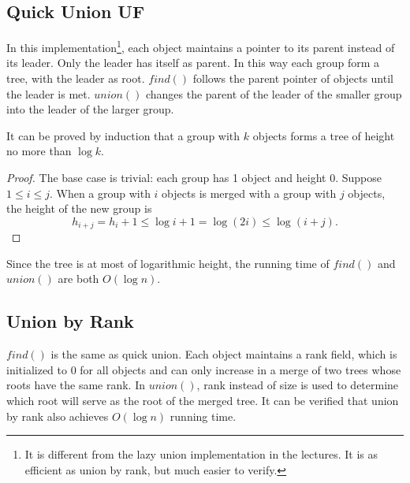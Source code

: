 \subsection{Quick Union UF}
\begin{multicols}{2}
\begin{algorithmic}[1]
\EndWhile
{}
\EndFunction
\end{algorithmic}
\columnbreak
\begin{algorithmic}[1]
\Else
{}
\EndIf
\EndFunction
\end{algorithmic}
\end{multicols}
In this implementation\footnote{It is different from the lazy union implementation in the lectures. It is as efficient as union by rank, but much easier to verify.}, each object maintains a pointer to its parent instead of its leader. Only the leader has itself as parent. In this way each group form a tree, with the leader as root. $find()$ follows the parent pointer of objects until the leader is met. $union()$ changes the parent of the leader of the smaller group into the leader of the larger group. 

It can be proved by induction that a group with $k$ objects forms a tree of height no more than $\log k$. 
\begin{proof}
The base case is trivial: each group has 1 object and height 0. Suppose $1\leq i\leq j$. When a group with $i$ objects is merged with a group with $j$ objects, the height of the new group is 
$$h_{i+j}=h_i+1\leq \log i + 1 = \log(2i)\leq\log(i+j).$$
\end{proof}
Since the tree is at most of logarithmic height, the running time of $find()$ and $union()$ are both $O(\log n).$
\subsection{Union by Rank}
\begin{multicols}{2}
\begin{algorithmic}[1]
\EndWhile
{}
\EndFunction
\end{algorithmic}
\columnbreak
\begin{algorithmic}[1]
\Else{}
\EndIf
\EndFunction
\end{algorithmic}
\end{multicols}
$find()$ is the same as quick union. Each object maintains a rank field, which is initialized to 0 for all objects and can only increase in a merge of two trees whose roots have the same rank. In $union()$, rank instead of size is used to determine which root will serve as the root of the merged tree. It can be verified that union by rank also achieves $O(\log n)$ running time. 

